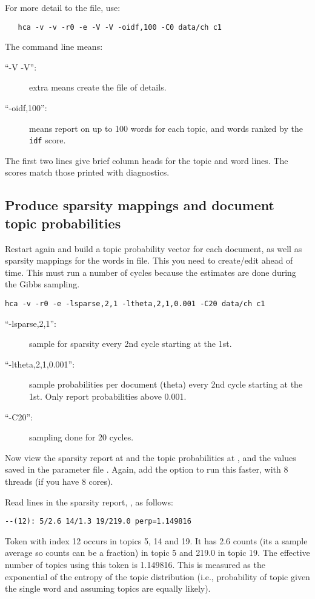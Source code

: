 \documentclass[a4paper,english]{article}
\begin{document}
For more detail to the  file, use:
\begin{verbatim}
   hca -v -v -r0 -e -V -V -oidf,100 -C0 data/ch c1
\end{verbatim}
The command line means:
\begin{description}
\item[``-V -V'':] extra  means create the 
 file of details.
\item[``-oidf,100'':] means report on up to 100 words for each topic,
and words ranked by the \texttt{idf} score.
\end{description}
The first two lines give brief column heads for the topic and word lines.
The scores match those printed with diagnostics.

\subsection{Produce sparsity mappings and document topic probabilities}
Restart again and build a topic probability vector for each document,
as well as sparsity mappings for the words in 
 file.
This you need to create/edit ahead of time.
This must run a number of cycles because the estimates are done 
during the Gibbs sampling.
\begin{verbatim}
hca -v -r0 -e -lsparse,2,1 -ltheta,2,1,0.001 -C20 data/ch c1
\end{verbatim} 
\begin{description}
\item[``-lsparse,2,1'':] sample for sparsity every 2nd cycle
starting at the 1st.
\item[``-ltheta,2,1,0.001'':] sample probabilities per document
(theta) every 2nd cycle
starting at the 1st.
Only report probabilities above 0.001.
\item[``-C20'':] sampling done for 20 cycles.
\end{description}
Now view the sparsity report at  and
the topic probabilities at ,
and the values saved in the parameter file .
Again, add the  option to run this faster,
with 8 threads (if you have 8 cores).

Read lines in the sparsity report, , as follows:
\begin{verbatim}
--(12): 5/2.6 14/1.3 19/219.0 perp=1.149816
\end{verbatim} 
Token with index 12 occurs in topics 5, 14 and 19.
It has 2.6 counts (its a sample average so counts can be a fraction)
in topic 5 and 219.0 in topic 19.
The effective number of topics using this token is 1.149816.
This is measured as the exponential of the entropy of the topic distribution 
(i.e., probability of topic given the single word and assuming topics
are equally likely).
\end{document}
